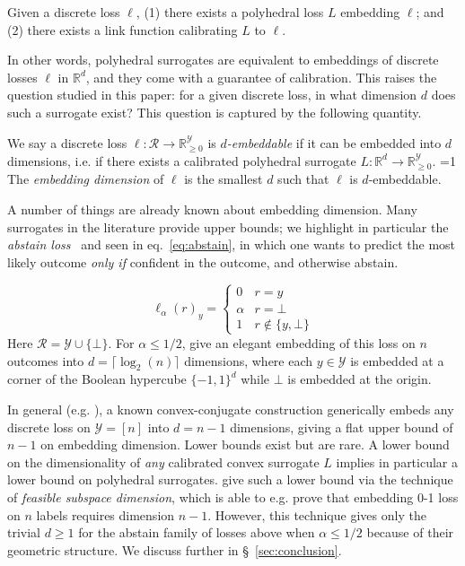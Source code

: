 \documentclass[final]{colt2020} %
\newcommand{\Comments}{1}
\newcommand{\mynote}[2]{\ifnum\Comments=1\textcolor{#1}{#2}\fi}
\newcommand{\mytodo}[2]{\ifnum\Comments=1%
	\todo[linecolor=#1!80!black,backgroundcolor=#1,bordercolor=#1!80!black]{#2}\fi}
\newcommand{\jessie}[1]{\mynote{purple}{[JF: #1]}}
\newcommand{\jessiet}[1]{\mytodo{purple!20!white}{JF: #1}}
\newcommand{\bo}[1]{\mynote{blue}{[Bo: #1]}}
\newcommand{\reals}{\mathbb{R}}
\newcommand{\nonnegreals}{\reals_{\geq 0}}%
\newcommand{\R}{\mathcal{R}}
\newcommand{\Y}{\mathcal{Y}}
\newcommand{\ellabs}[1]{\ell_{#1}}
\begin{document}
\begin{theorem} \label{thm:embed-iff-poly}
  Given a discrete loss $\ell$, (1) there exists a polyhedral loss $L$ embedding $\ell$; and (2) there exists a link function calibrating $L$ to $\ell$.
\end{theorem}
In other words, polyhedral surrogates are equivalent to embeddings of discrete losses $\ell$ in $\reals^d$, and they come with a guarantee of calibration.
This raises the question studied in this paper: for a given discrete loss, in what dimension $d$ does such a surrogate exist?
This question is captured by the following quantity.

\begin{definition}
  We say a discrete loss $\ell: \R \to \nonnegreals^{\Y}$ is \emph{$d$-embeddable} if it can be embedded into $d$ dimensions, i.e. if there exists a calibrated polyhedral surrogate $L: \reals^d \to \nonnegreals^{\Y}$. \jessiet{Can we revisit this definition post i.e.?}
  The \emph{embedding dimension} of $\ell$ is the smallest $d$ such that $\ell$ is $d$-embeddable.
\end{definition}

A number of things are already known about embedding dimension.
Many surrogates in the literature provide upper bounds; we highlight in particular the \emph{abstain loss}~\citep{ramaswamy2018consistent} and seen in eq.~\eqref{eq:abstain}, in which one wants to predict the most likely outcome \emph{only if} confident in the outcome, and otherwise abstain.

\begin{equation}\label{eq:abstain}
\ellabs{\alpha}(r)_y = \begin{cases}
0 & r = y\\
\alpha & r = \bot\\
1 & r \not \in \{y, \bot\}
\end{cases}
\end{equation}
Here $\R = \Y \cup \{\bot\}$.
For $\alpha \leq 1/2$, \citet{ramaswamy2018consistent} give an elegant embedding of this loss on $n$ outcomes into $d = \lceil \log_2 (n) \rceil$ dimensions, where each $y \in \Y$ is embedded at a corner of the Boolean hypercube $\{-1,1\}^d$ while $\bot$ is embedded at the origin.

In general (e.g. \citet[Corollary 13]{ramaswamy2016convex}), a known convex-conjugate construction generically embeds any discrete loss on $\Y = [n]$ into $d = n-1$ dimensions, giving a flat upper bound of $n-1$ on embedding dimension.
Lower bounds exist but are rare.
A lower bound on the dimensionality of \emph{any} calibrated convex surrogate $L$ implies in particular a lower bound on polyhedral surrogates.
\citet{ramaswamy2016convex} give such a lower bound via the technique of \emph{feasible subspace dimension}, which is able to e.g. prove that embedding 0-1 loss on $n$ labels requires dimension $n-1$.
However, this technique gives only the trivial $d \geq 1$ for the abstain family of losses above when $\alpha \leq 1/2$ because of their geometric structure.
We discuss further in \S~\ref{sec:conclusion}.
\end{document}
